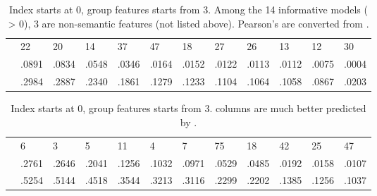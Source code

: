 \begin{table}
    \centering
    \begin{ThreePartTable}
    \begin{tabularx}{\textwidth}{p{1.7cm} *{11}{L}}
     \\
    \toprule
     & 22 & 20 & 14 & 37 & 47 & 18 & 27 & 26 & 13 & 12 & 30 \\  
     & .0891 & .0834 & .0548 & .0346 & .0164 & .0152 & .0122 & .0113 & .0112 & .0075 & .0004 \\  
     & .2984 & .2887 & .2340 & .1861 & .1279 & .1233 & .1104 & .1064 & .1058 & .0867 & .0203 \\
    \bottomrule
    \end{tabularx}
    \end{ThreePartTable}
    \caption[\texttt{SIM} Predicted \texttt{ASN} Column Model Performances]{Index starts at 0,  group features starts from 3.  Among the 14 informative models ( > 0), 3 are non-semantic features (not listed above). Pearson's  are converted from . \label{tab:SIMASNScores}}
\end{table}

\begin{table}
    \centering
    \begin{ThreePartTable}
    \begin{tabularx}{\textwidth}{p{1.7cm} *{11}{L}}
     \\
    \toprule
     & 6 & 3 & 5 & 11 & 4 & 7 & 75 & 18 & 42 & 25 & 47 \\  
     & .2761 & .2646 & .2041 & .1256 & .1032 & .0971 & .0529 & .0485 & .0192 & .0158 & .0107 \\  
     & .5254 & .5144 & .4518 & .3544 & .3213 & .3116 & .2299 & .2202 & .1385 & .1256 & .1037 \\
    \bottomrule
    \end{tabularx}
    \end{ThreePartTable}
    \caption[\texttt{ASN} Predicted \texttt{SIM} Column Model Performances]{Index starts at 0,  group features starts from 3.  columns are much better predicted by . \label{tab:ASNSIMScores}}
\end{table}

